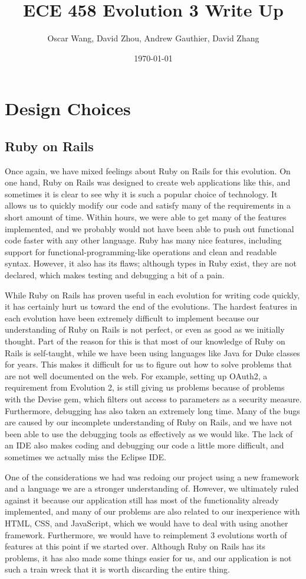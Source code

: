 \documentclass{article}
\author{Oscar Wang, David Zhou, Andrew Gauthier, David Zhang}
\date{\today}
\title{ECE 458 Evolution 3 Write Up}
\begin{document}
\maketitle
\section{Design Choices}
\subsection{Ruby on Rails}
Once again, we have mixed feelings about Ruby on Rails for this evolution.  On one hand, Ruby on Rails was designed to create web applications like this, and sometimes it is clear to see why it is such a popular choice of technology.  It allows us to quickly modify our code and satisfy many of the requirements in a short amount of time.  Within hours, we were able to get many of the features implemented, and we probably would not have been able to push out functional code faster with any other language.  Ruby has many nice features, including support for functional-programming-like operations and clean and readable syntax.  However, it also has its flaws; although types in Ruby exist, they are not declared, which makes testing and debugging a bit of a pain.\par
While Ruby on Rails has proven useful in each evolution for writing code quickly, it has certainly hurt us toward the end of the evolutions.  The hardest features in each evolution have been extremely difficult to implement because our understanding of Ruby on Rails is not perfect, or even as good as we initially thought.  Part of the reason for this is that most of our knowledge of Ruby on Rails is self-taught, while we have been using languages like Java for Duke classes for years.  This makes it difficult for us to figure out how to solve problems that are not well documented on the web.  For example, setting up OAuth2, a requirement from Evolution 2, is still giving us problems because of problems with the Devise gem, which filters out access to parameters as a security measure.  Furthermore, debugging has also taken an extremely long time. Many of the bugs are caused by our incomplete understanding of Ruby on Rails, and we have not been able to use the debugging tools as effectively as we would like.  The lack of an IDE also makes coding and debugging our code a little more difficult, and sometimes we actually miss the Eclipse IDE.\par
One of the considerations we had was redoing our project using a new framework and a language we are a stronger understanding of.  However, we ultimately ruled against it because our application still has most of the functionality already implemented, and many of our problems are also related to our inexperience with HTML, CSS, and JavaScript, which we would have to deal with using another framework.  Furthermore, we would have to reimplement 3 evolutions worth of features at this point if we started over.  Although Ruby on Rails has its problems, it has also made some things easier for us, and our application is not such a train wreck that it is worth discarding the entire thing.
\end{document}
